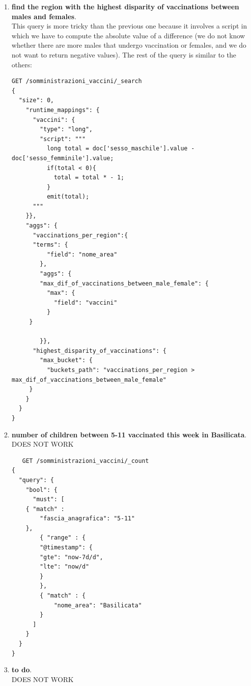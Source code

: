 \documentclass{article}
\begin{document}
\begin{enumerate}
\begin{lstlisting}
  ]
    }},
  "aggs": {
    "vaccine_doses_received": {
      "sum": {
        "field": "numero_dosi"
      }
    }
  }
}
\end{lstlisting}
\item \textbf{find the region with the highest disparity of vaccinations between males and females}.\\
This query is more tricky than the previous one because it involves a script in which we have to compute the absolute value of a difference (we do not know whether there are more males that undergo vaccination or females, and we do not want to return negative values). The rest of the query is similar to the others:
\begin{lstlisting}
GET /somministrazioni_vaccini/_search
{
  "size": 0,
    "runtime_mappings": {
      "vaccini": {
        "type": "long",
        "script": """
          long total = doc['sesso_maschile'].value - doc['sesso_femminile'].value;
          if(total < 0){
            total = total * - 1;
          }
          emit(total);
      """
    }},
    "aggs": {
      "vaccinations_per_region":{
      "terms": {
          "field": "nome_area"
        },
        "aggs": {
        "max_dif_of_vaccinations_between_male_female": {
          "max": {
            "field": "vaccini"
          }
     }
          
        }},
      "highest_disparity_of_vaccinations": {
        "max_bucket": {
          "buckets_path": "vaccinations_per_region > max_dif_of_vaccinations_between_male_female" 
     }
    }
  }
}
\end{lstlisting}
\item \textbf{number of children between 5-11 vaccinated this week in Basilicata}.\\
DOES NOT WORK
\begin{lstlisting}
   GET /somministrazioni_vaccini/_count
{
  "query": {
    "bool": {
      "must": [
	{ "match" : 
	    "fascia_anagrafica": "5-11" 
	},
        { "range" : {
	    "@timestamp": {
		"gte": "now-7d/d",
		"lte": "now/d"
	    }
        },
        { "match" : {
            "nome_area": "Basilicata"
        }
      ]
    }
  }
}
\end{lstlisting}
\item \textbf{to do}.\\
DOES NOT WORK
\begin{lstlisting}
   

\end{lstlisting}
\end{enumerate}
\end{document}
